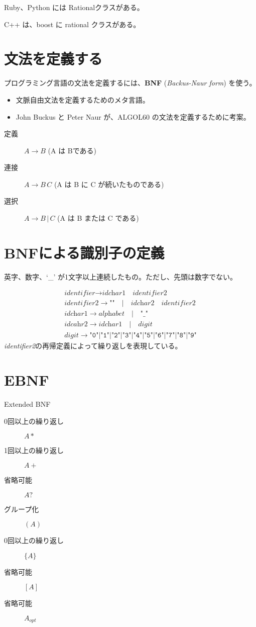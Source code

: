 \documentclass[slide,papersize,fleqn,22pt]{jsarticle}
\begin{document}
Ruby、Python には Rationalクラスがある。

C++ は、boost に rational クラスがある。

\section{文法を定義する}
\small
プログラミング言語の文法を定義するには、\textbf{BNF}
(\textsl{Backus-Naur form\/}) を使う。
\begin{itemize}
\item 文脈自由文法を定義するためのメタ言語。
\item John Buckus と Peter Naur が、ALGOL60 の文法を定義するために考案。
\end{itemize}
\begin{description}
\item[定義] $A \rightarrow B$  (A は Bである)
\item[連接] $A \rightarrow B\,C$ (A は B に C が続いたものである)
\item[選択] $A \rightarrow B\,|\,C$ (A は B または C である)
\end{description}

\section{BNFによる識別子の定義}
\begin{tcolorbox}[nobeforeafter]
  \tiny
英字、数字、`\_' が1文字以上連続したもの。ただし、先頭は数字でない。
\end{tcolorbox}
\newcommand{\OR}{\quad|\quad}%
\newcommand{\q}{\quad}%
\footnotesize
\begin{gather*}
\textit{identifier} \rightarrow \textit{idchar1}\quad
\textit{identifier2} \\
\textit{identifier2} \rightarrow \texttt{""}\OR\textit{idchar2}\quad
\textit{identifier2} \\
\textit{idchar1}\rightarrow\textit{alphabet}\OR\texttt{"\_"} \\
\textit{idcahr2}\rightarrow\textit{idchar1}\OR\textit{digit} \\
\textit{digit}\rightarrow\texttt{"0"}|\texttt{"1"}|\texttt{"2"}|\texttt{"3"}|\texttt{"4"}|\texttt{"5"}|\texttt{"6"}|\texttt{"7"}|\texttt{"8"}|\texttt{"9"}
\end{gather*}
\tiny\vfill
\textit{identifier2}の再帰定義によって繰り返しを表現している。
\normalsize
\section{EBNF}
Extended BNF
\begin{description}
\item[0回以上の繰り返し] $A*$
\item[1回以上の繰り返し] $A+$
\item[省略可能] $A?$
\item[グループ化] $(A)$
\item[0回以上の繰り返し] $\{A\}$
\item[省略可能] $[A]$
\item[省略可能] $A_{opt}$
\end{description}
\end{document}

